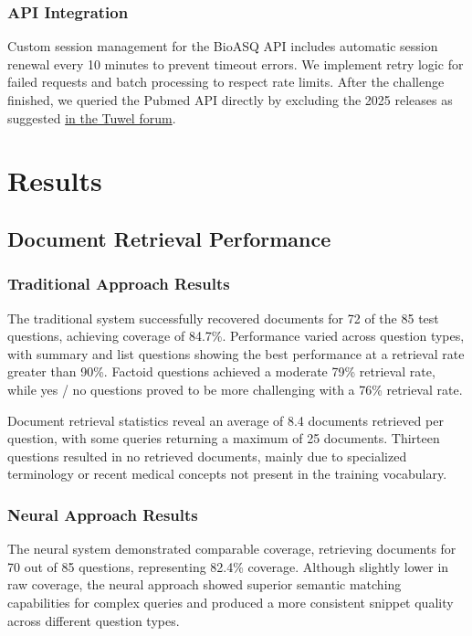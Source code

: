 \documentclass[12pt]{article}
\begin{document}
\subsubsection{API Integration}

Custom session management for the BioASQ API includes automatic session renewal every 10 minutes to prevent timeout errors. We implement retry logic for failed requests and batch processing to respect rate limits. After the challenge finished, we queried the Pubmed API directly by excluding the 2025 releases as suggested \href{https://tuwel.tuwien.ac.at/mod/forum/discuss.php?d=490382#p1108991}{in the Tuwel forum}.

\section{Results}\label{sec:results}

\subsection{Document Retrieval Performance}

\subsubsection{Traditional Approach Results}

The traditional system successfully recovered documents for 72 of the 85 test questions, achieving coverage of 84.7\%. Performance varied across question types, with summary and list questions showing the best performance at a retrieval rate greater than 90\%. Factoid questions achieved a moderate 79\% retrieval rate, while yes / no questions proved to be more challenging with a 76\% retrieval rate.

Document retrieval statistics reveal an average of 8.4 documents retrieved per question, with some queries returning a maximum of 25 documents. Thirteen questions resulted in no retrieved documents, mainly due to specialized terminology or recent medical concepts not present in the training vocabulary.

\subsubsection{Neural Approach Results}

The neural system demonstrated comparable coverage, retrieving documents for 70 out of 85 questions, representing 82.4\% coverage. Although slightly lower in raw coverage, the neural approach showed superior semantic matching capabilities for complex queries and produced a more consistent snippet quality across different question types.
\end{document}
